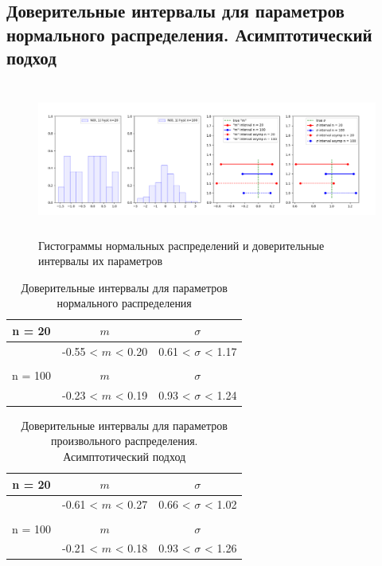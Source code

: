 \subsection{Доверительные интервалы для параметров нормального распределения. Асимптотический подход}
    \begin{figure}[H]
		\centering
		    \includegraphics[width = 15cm, height = 5cm]{part_asymp_normal_estimates/figures/norm_asymp}
		\caption{Гистограммы нормальных распределений и доверительные интервалы их параметров}
		\label{fig:hist_norm_estimates}
	\end{figure}

	\begin{table}[H]
	    \centering
	    \begin{tabular}{| c | c | c |}
	    \hline
	       n = 20   &  $m$  & $\sigma$\\ \hline
	          &  -0.55 < $m$ < 0.20 & 0.61 < $\sigma$ < 1.17 \\ \hline
	         &   &   \\ \hline
	       n = 100   &  $m$  & $\sigma$\\ \hline
	        & -0.23 < $m$ < 0.19 & 0.93 < $\sigma$ < 1.24 \\
	   \hline
	    \end{tabular}
	    \caption{Доверительные интервалы для параметров нормального распределения}
	    \label{tab:interv_simple}
	\end{table}

	\begin{table}[H]
	    \centering
	    \begin{tabular}{| c | c | c |}
	    \hline
	       n = 20   &  $m$  & $\sigma$\\ \hline
	          &  -0.61 < $m$ < 0.27 & 0.66 < $\sigma$ < 1.02 \\ \hline
	         &   &   \\ \hline
	       n = 100   &  $m$  & $\sigma$\\ \hline
	        & -0.21 < $m$ < 0.18 & 0.93 < $\sigma$ < 1.26 \\
	   \hline
	    \end{tabular}
	    \caption{Доверительные интервалы для параметров произвольного распределения. Асимптотический подход}
	    \label{tab:interv_asimpt}
	\end{table}